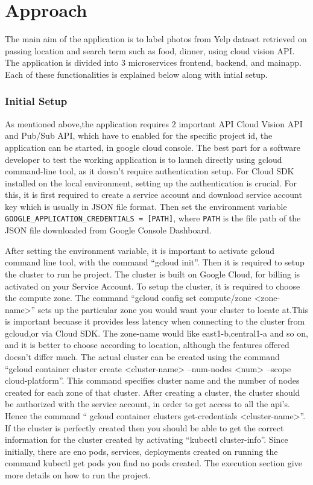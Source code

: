 \section{Approach}

The main aim of the application is to label photos from Yelp dataset
retrieved on passing location and search term such as food, dinner,
using cloud vision API. The application is divided into 3
microservices frontend, backend, and mainapp. Each of these
functionalities is explained below along with intial setup.

\subsubsection{Initial Setup}

As mentioned above,the application requires 2 important API Cloud
Vision API and Pub/Sub API, which have to enabled for the specific
project id, the application can be started, in google cloud
console. The best part for a software developer to test the working
application is to launch directly using gcloud command-line tool, as
it doesn’t require authentication setup.  For Cloud SDK installed on
the local environment, setting up the authentication is crucial. For
this, it is first required to create a service account and download
service account key which is usually in JSON file format. Then set the
environment variable \verb|GOOGLE_APPLICATION_CREDENTIALS = [PATH]|,
where \verb|PATH| is the file path of the JSON file downloaded from
Google Console Dashboard.

After setting the environment variable, it is important to activate
gcloud command line tool, with the command ``gcloud init''. Then it is
required to setup the cluster to run he project.  The cluster is built
on Google Cloud, for billing is activated on your Service Account. To
setup the cluster, it is required to choose the compute zone. The
command ``gcloud config set compute/zone <zone-name>'' sets up the
particular zone you would want your cluster to locate at.This is
important becuase it provides less latency when connecting to the
cluster from gcloud,or via Cloud SDK. The zone-name would like
east1-b,central1-a and so on, and it is better to choose according to
location, although the features offered doesn't differ much. The
actual cluster can be created using the command ``gcloud container
cluster create <cluster-name> --num-nodes <num> --scope
cloud-platform''. This command specifies cluster name and the number
of nodes created for each zone of that cluster.  After creating a
cluster, the cluster should be authorized with the service account, in
order to get access to all the api's. Hence the command `` gcloud
container clusters get-credentials <cluster-name>''. If the cluster
is perfectly created then you should be able to get the correct
information for the cluster created by activating ``kubectl
cluster-info''. Since initially, there are eno pods, services,
deployments created on running the command kubectl get pods you find
no pods created. The execution section give more details on how to run
the project.

